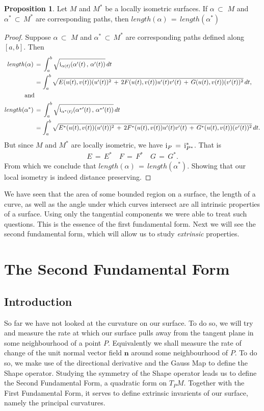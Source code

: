 \documentclass{UKZNcomp}
\newcommand{\vect}[1]{\mathbf{#1}} %
\newcommand{\RN}[1]{%
  \textup{\uppercase\expandafter{\romannumeral#1}}%
}
\theoremstyle{definition}
\newtheorem{prop}[definition]{Proposition}
\theoremstyle{remark}
\begin{document}
\begin{prop}
Let $M$ and $M^*$ be a locally isometric surfaces. If $\alpha\,\subset\,\,M$ and $\alpha^*\,\subset\,M^*$ are corresponding paths, then $length(\alpha)\,=\,length(\alpha^*)$
\end{prop}
\begin{proof}
Suppose $\alpha\,\subset\,\,M$ and $\alpha^*\,\subset\,M^*$ are corresponding paths defined along $[a,b]$. Then 
\begin{align*}
length(\alpha)\,&=\, \int_a^b \sqrt{\RN{1}_{\vect{\alpha}(t)}(\vect{\alpha}'(t)\, , \, \vect{\alpha}'(t))}  \, dt\\
&= \int_a^b \sqrt{E(u(t),v(t))(u'(t))^2 \, + \, 2F(u(t),v(t))u'(t)v'(t) \, + \, G(u(t),v(t))(v'(t))^2} \, dt,\\
\text{and}&\\
length(\alpha^*)\,&=\, \int_a^b \sqrt{\RN{1}_{\vect{\alpha^*}(t)}(\vect{\alpha^*}'(t)\, , \, \vect{\alpha^*}'(t))}  \, dt\\
&= \int_a^b \sqrt{E^{*}(u(t),v(t))(u'(t))^2 \, + \, 2F^*(u(t),v(t))u'(t)v'(t) \, + \, G^*(u(t),v(t))(v'(t))^2} \, dt.
\end{align*}
But since $M$ and $M^*$ are locally isometric, we have $\RN{1}_P\,=\,\RN{1}^*_{P^*}$. That is
\begin{align*}
E\,=\,E^*\quad F\,=\,F^* \quad G\,=\,G^*.
\end{align*}
From which we conclude that $length(\alpha)\,=\,length(\alpha^*)$. Showing that our local isometry is indeed distance preserving.
\end{proof}

We have seen that the area of some bounded region on a surface, the length of a curve, as well as the angle under which curves intersect are all intrinsic properties of a surface. Using only the tangential components we were able to treat such questions. This is the essence of the first fundamental form. Next we will see the second fundamental form, which will allow us to study \textit{extrinsic} properties.
\clearpage

\chapter{The Second Fundamental Form}

\section{Introduction}
So far we have not looked at the curvature on our surface. To do so, we will try and measure the rate at which our surface pulls away from the tangent plane in some neighbourhood of a point $P$. Equivalently we shall measure the rate of change of the unit normal vector field $\vect n$ around some neighbourhood of $P$. To do so, we make use of the directional derivative and the Gauss Map to define the Shape operator. Studying the symmetry of the Shape operator leads us to define the Second Fundamental Form, a quadratic form on $T_PM$. Together with the First Fundamental Form, it serves to define extrinsic invarients of our surface, namely the principal curvatures. 
\end{document}

